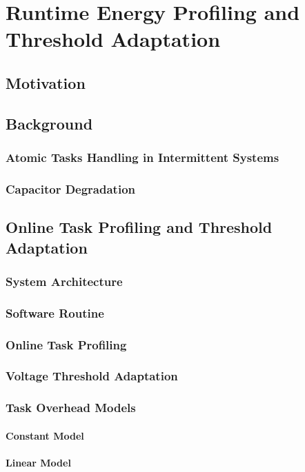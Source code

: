 \chapter{Runtime Energy Profiling and Threshold Adaptation}

\section{Motivation}

\section{Background}
\subsection{Atomic Tasks Handling in Intermittent Systems}
\subsection{Capacitor Degradation}

\section{Online Task Profiling and Threshold Adaptation}
\subsection{System Architecture}
\subsection{Software Routine}
\subsection{Online Task Profiling}
\subsection{Voltage Threshold Adaptation}
\subsection{Task Overhead Models}
\subsubsection{Constant Model}
\subsubsection{Linear Model}


